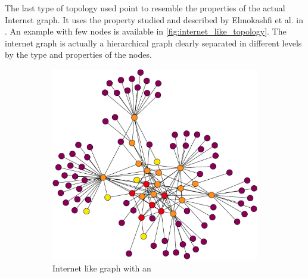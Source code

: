 The last type of topology used point to resemble the properties of the actual 
Internet graph.
It uses the property studied and described by Elmokashfi et al. in \cite{elmokashfi2010scalability}.
An example with few nodes is available in \cref{fig:internet_like_topology}.
The internet graph is actually a hierarchical graph clearly separated in different
levels by the type and properties of the nodes.

\begin{figure}[ht]
     \centering
     \begin{subfigure}[b]{0.4\textwidth}
         \centering
         \includegraphics[width=\textwidth]{images/internet_graph/graph-100-colored.pdf}
		 \caption{Internet like graph with an }
         \label{fig:internet_topology_explosive}
     \end{subfigure}
     \hfill
     \begin{subfigure}[b]{0.4\textwidth}
         \centering

\end{subfigure}
\end{figure}
